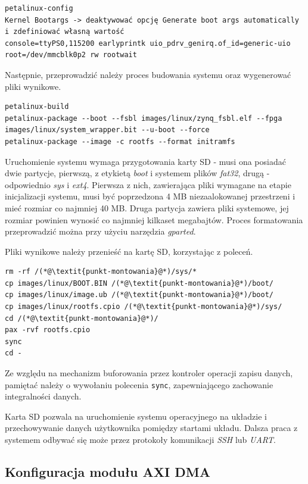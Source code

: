 \begin{lstlisting}[breaklines=true]
petalinux-config
Kernel Bootargs -> deaktywować opcję Generate boot args automatically i zdefiniować własną wartość
console=ttyPS0,115200 earlyprintk uio_pdrv_genirq.of_id=generic-uio root=/dev/mmcblk0p2 rw rootwait 
\end{lstlisting}
Następnie, przeprowadzić należy proces budowania systemu oraz wygenerować pliki wynikowe.

\begin{lstlisting}[breaklines=true]
petalinux-build
petalinux-package --boot --fsbl images/linux/zynq_fsbl.elf --fpga images/linux/system_wrapper.bit --u-boot --force
petalinux-package --image -c rootfs --format initramfs
\end{lstlisting}

Uruchomienie systemu wymaga przygotowania karty SD - musi ona posiadać dwie partycje, pierwszą, z etykietą \emph{boot} i systemem plików \emph{fat32}, drugą - odpowiednio \emph{sys} i \emph{ext4}. Pierwsza z nich, zawierająca pliki wymagane na etapie inicjalizacji systemu, musi być poprzedzona 4 MB niezaalokowanej przestrzeni i mieć rozmiar co najmniej 40 MB. Druga partycja zawiera pliki systemowe, jej rozmiar powinien wynosić co najmniej kilkaset megabajtów. Proces formatowania przeprowadzić można przy użyciu narzędzia \emph{gparted}.

Pliki wynikowe należy przenieść na kartę SD, korzystając z poleceń.

\begin{lstlisting}[breaklines=true]
rm -rf /(*@\textit{punkt-montowania}@*)/sys/*
cp images/linux/BOOT.BIN /(*@\textit{punkt-montowania}@*)/boot/
cp images/linux/image.ub /(*@\textit{punkt-montowania}@*)/boot/
cp images/linux/rootfs.cpio /(*@\textit{punkt-montowania}@*)/sys/
cd /(*@\textit{punkt-montowania}@*)/
pax -rvf rootfs.cpio
sync
cd -
\end{lstlisting}

Ze względu na mechanizm buforowania przez kontroler operacji zapisu danych, pamiętać należy o wywołaniu polecenia \texttt{sync}, zapewniającego zachowanie integralności danych.

Karta SD pozwala na uruchomienie systemu operacyjnego na układzie i przechowywanie danych użytkownika pomiędzy startami układu. Dalsza praca z systemem odbywać się może przez protokoły komunikacji \emph{SSH} lub \emph{UART}.

\subsection{Konfiguracja modułu AXI DMA}
\label{sec:vivado-axi-dma}

